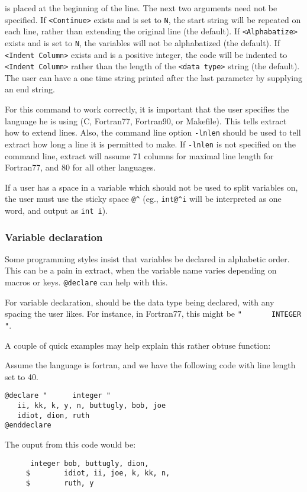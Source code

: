{\tt <start string>} is placed at the beginning of the line.
The next two arguments need not be specified.
If \verb+<Continue>+ exists and is set to \verb+N+, the start string will be
repeated on each line, rather than extending the original line (the default).
If \verb+<Alphabatize>+ exists and is set to \verb+N+, the variables will
not be alphabatized (the default).  If \verb+<Indent Column>+ exists and is a 
positive integer, the code will be indented to \verb+<Indent Column>+ rather
than the length of the \verb+<data type>+ string (the default).  The user can
have a one time string printed after the last parameter by supplying an
end string.

For this command to work correctly, it is important that the user specifies
the language he is using (C, Fortran77, Fortran90, or Makefile).  This tells
extract how to extend lines.  Also, the command line option {\tt -lnlen} should
be used to tell extract how long a line it is permitted to make.  If 
{\tt -lnlen} is not specified on the command line, extract will assume 71
columns for maximal line length for Fortran77, and 80 for all other languages.

If a user has a space in a variable which should not be used to split
variables on,
the user must use the sticky space \verb+@^+ (eg., \verb+int@^i+ will be
interpreted as one word, and output as {\tt int i}).

\subsubsection{Variable declaration}
\noindent

Some programming styles insist that variables be declared in alphabetic
order.  This can be a pain in extract, when the variable name varies 
depending on macros or keys.  {\tt @declare} can help with this.

For variable declaration, {\tt <start string>} should be the data type
being declared, with any spacing the user likes.  For instance, in Fortran77,
this might be 
\verb+"       INTEGER "+.  

A couple of quick examples may help explain this rather obtuse function:

Assume the language is fortran, and we have the following code with
line length set to 40.
\begin{verbatim}
@declare "      integer "
   ii, kk, k, y, n, buttugly, bob, joe
   idiot, dion, ruth
@enddeclare
\end{verbatim}
The ouput from this code would be:
\begin{verbatim}
      integer bob, buttugly, dion,
     $        idiot, ii, joe, k, kk, n,
     $        ruth, y
\end{verbatim}


